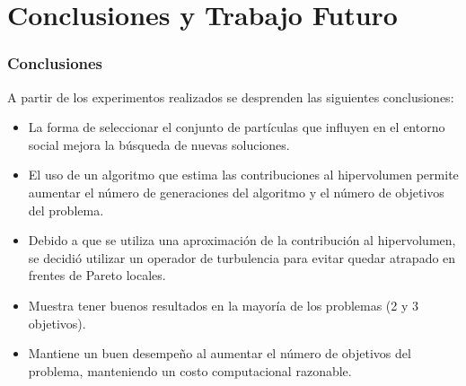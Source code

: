 \documentclass[10pt,compress]{beamer}
\begin{document}
\section{Conclusiones y Trabajo Futuro}
\frame{\tableofcontents[currentsection]}
\begin{frame}
	\frametitle{Conclusiones}
	\begin{block}{A partir de los experimentos realizados se desprenden las siguientes conclusiones:}
	\begin{itemize}
   
  \item La forma de seleccionar el conjunto de part\'iculas que influyen en el entorno social mejora 
  la b\'usqueda de nuevas soluciones. 
  
  \item El uso de un algoritmo que estima las contribuciones al hipervolumen permite aumentar el n\'umero de generaciones 
  del algoritmo y el n\'umero de objetivos del problema.
  
  \item Debido a que se utiliza una aproximaci\'on de la contribuci\'on al hipervolumen, se decidi\'o utilizar un operador de 
  turbulencia para evitar quedar atrapado en frentes de Pareto locales.
    
  \item Muestra tener buenos resultados en la mayor\'ia de los problemas (2 y 3 objetivos).
  
  \item Mantiene un buen desempe\~no al aumentar el n\'umero de objetivos del problema, manteniendo un costo computacional 
  razonable.
  \end{itemize}
	\end{block}
\end{frame}
\end{document}
